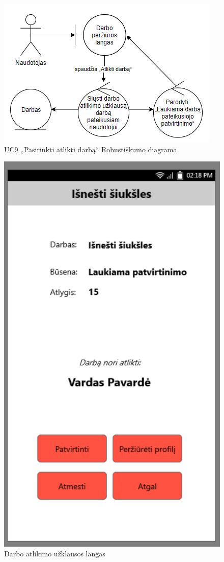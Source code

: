 \documentclass{VUMIFPSbakalaurinis}
\begin{document}
\begin{figure}[H]
	\centering
	\includegraphics[scale=0.6]{img/Robustness/UC9}
	\caption{UC9 „Pasirinkti atlikti darbą“ Robustiškumo diagrama}
	\label{img:uc9rob}
\end{figure}

\begin{figure}[H]
	\centering
	\includegraphics[scale=0.4]{img/ScreenShots/2}
	\caption{Darbo atlikimo užklausos langas}
	\label{img:selected job 2}
\end{figure}
\end{document}
